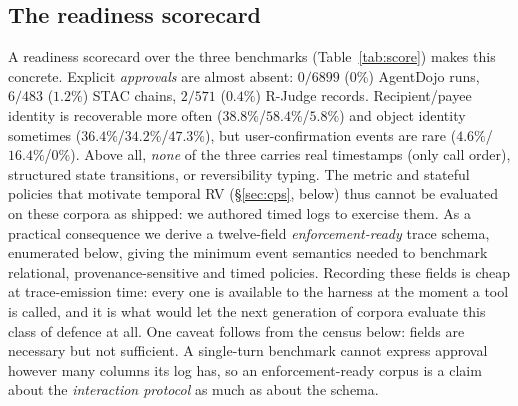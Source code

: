 \documentclass[sigconf]{acmart}
\begin{document}
\subsection{The readiness scorecard}

A readiness scorecard over the three
benchmarks (Table~\ref{tab:score}) makes this concrete. Explicit \emph{approvals} are almost absent: $0/6899$ ($0\%$)
AgentDojo runs, $6/483$ ($1.2\%$) STAC chains, $2/571$ ($0.4\%$) R-Judge records.
Recipient/payee identity is recoverable more often ($38.8\%$/$58.4\%$/$5.8\%$) and
object identity sometimes ($36.4\%$/$34.2\%$/$47.3\%$), but user-confirmation events
are rare ($4.6\%$/$16.4\%$/$0\%$). Above all, \emph{none} of the three carries real
timestamps (only call order), structured state transitions, or reversibility typing.
The metric and stateful policies that motivate temporal RV (\S\ref{sec:cps}, below) thus
cannot be evaluated on these corpora as shipped: we authored timed logs to exercise
them. As a practical consequence we derive a twelve-field \emph{enforcement-ready} trace
schema, enumerated below, giving the minimum
event semantics needed to
benchmark relational, provenance-sensitive and timed policies. Recording these fields is
cheap at trace-emission time: every one is available to the harness at the moment a
tool is called, and it is what would let the next generation of corpora evaluate this
class of defence at all. One caveat follows from the census below: fields are necessary
but not sufficient. A single-turn benchmark cannot express approval however many columns
its log has, so an enforcement-ready corpus is a claim about the \emph{interaction
protocol} as much as about the schema.
\end{document}
